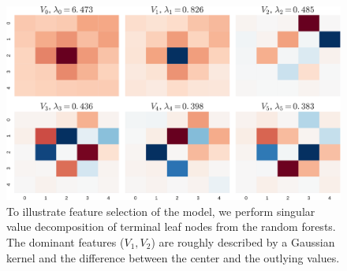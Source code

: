 \documentclass[landscape]{sciposter}
\newlength{\customfigwidth}
\begin{document}
\begin{multicols}{3}
\begin{figure}
    \center 
    \includegraphics[width=1.25\customfigwidth]{figures/avg_features-crop.pdf}%
\caption{
To illustrate feature selection of the model, we perform singular value decomposition of terminal leaf nodes from the random forests. The dominant features ($V_1, V_2$) are roughly described by a Gaussian kernel and the difference between the center and the outlying values.
}
\end{figure}


\small                     
 


%

\end{multicols}

 
\end{document}
